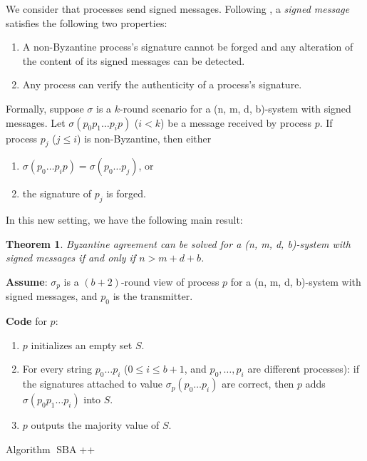 \documentclass[11pt,conference,compsoc,onecolumn,romanappendices]{IEEEtran}
\newcommand{\tmem}[1]{{\em #1\/}}
\newcommand{\tmop}[1]{\ensuremath{\operatorname{#1}}}
\newcommand{\tmstrong}[1]{\textbf{#1}}
\newenvironment{enumeratenumeric}{\begin{enumerate}[1.] }{\end{enumerate}}
\newenvironment{fkindent}{\begin{tmparmod}{0.0em}{1.0em}{0pt} }{\end{tmparmod}}
\newenvironment{tmparmod}[3]{\begin{list}{}{\setlength{\topsep}{0pt}\setlength{\leftmargin}{#1}\setlength{\rightmargin}{#2}\setlength{\parindent}{#3}\setlength{\listparindent}{\parindent}\setlength{\itemindent}{\parindent}\setlength{\parsep}{\parskip}} \item[]}{\end{list}}
\newtheorem{theorem}{Theorem}
\begin{document}
We consider that processes send signed messages. Following
{\cite{lamport1982byzantine}}, a {\tmem{signed message}} satisfies the
following two properties:
\begin{enumerate}
  \item A non-Byzantine process's signature cannot be forged and any alteration of
  the content of its signed messages can be detected.
  
  \item Any process can verify the authenticity of a process's signature.
\end{enumerate}
Formally, suppose $\sigma$ is a $k$-round scenario for a (n, m, d, b)-system
with signed messages. Let $\sigma (p_0 p_1 \ldots p_i p)$ ($i < k$) be a
message received by process $p$. If process $p_j$ ($j \leqslant i$) is
non-Byzantine, then either
\begin{enumeratenumeric}
  \item $\sigma (p_0 \ldots p_i p) = \sigma (p_0 \ldots p_j)$, or
  
  \item the signature of $p_j$ is forged.
\end{enumeratenumeric}
In this new setting, we have the following main result:

\begin{theorem}
  \label{thm-app-sba}Byzantine agreement can be solved for a (n, m, d, b)-system
  with signed messages if and only if $n > m + d + b$.
\end{theorem}

\begin{algorithm}[h]
    {\tmstrong{Assume}}: $\sigma_p$ is a $(b + 2)$-round view of process $p$
    for a (n, m, d, b)-system with signed messages, and $p_0$ is the
    transmitter.
    
    {\tmstrong{Code}} for $p$:
    \begin{fkindent}
      \begin{enumeratenumeric}
        \item $p$ initializes an empty set $S$.
        
        \item For every string $p_0 \ldots p_i$ ($0 \leqslant i \leqslant b +
        1$, and $p_0, \ldots, p_i$ are different processes): if the signatures
        attached to value $\sigma_p (p_0 \ldots p_i)$ are correct, then $p$
        adds $\sigma (p_0 p_1 \ldots p_i)$ into $S$.
        
        \item $p$ outputs the majority value of $S$.
      \end{enumeratenumeric}
    \end{fkindent}
    \caption{Algorithm $\tmop{SBA}$++\label{algo-sba}}
\end{algorithm}
\end{document}
